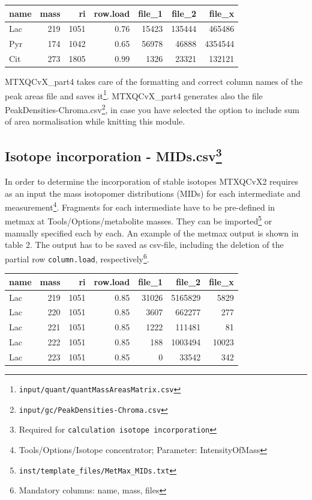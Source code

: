 \documentclass[]{book}
\let\rmarkdownfootnote\footnote%
\def\footnote{\protect\rmarkdownfootnote}
\theoremstyle{definition}
\theoremstyle{definition}
\theoremstyle{definition}
\theoremstyle{remark}
\begin{document}
\begin{tabular}{l|r|r|r|r|r|r}
\hline
name & mass & ri & row.load & file\_1 & file\_2 & file\_x\\
\hline
Lac & 219 & 1051 & 0.76 & 15423 & 135444 & 465486\\
\hline
Pyr & 174 & 1042 & 0.65 & 56978 & 46888 & 4354544\\
\hline
Cit & 273 & 1805 & 0.99 & 1326 & 23321 & 132121\\
\hline
\end{tabular}

MTXQCvX\_part4 takes care of the formatting and correct column names of
the peak areas file and saves it\footnote{\texttt{input/quant/quantMassAreasMatrix.csv}}.
MTXQCvX\_part4 generates also the file
PeakDensities-Chroma.csv\footnote{\texttt{input/gc/PeakDensities-Chroma.csv}},
in case you have selected the option to include sum of area
normalisation while knitting this module.

\subsection[Isotope incorporation - MIDs.csv]{\texorpdfstring{Isotope
incorporation - MIDs.csv\footnote{Required for
  \texttt{calculation\ isotope\ incorporation}}}{Isotope incorporation - MIDs.csv}}\label{isotope-incorporation---mids.csv}

In order to determine the incorporation of stable isotopes MTXQCvX2
requires as an input the mass isotopomer distributions (MIDs) for each
intermediate and measurement\footnote{Tools/Options/Isotope
  concentrator; Parameter: IntensityOfMass}. Fragments for each
intermediate have to be pre-defined in metmax at
Tools/Options/metabolite masses. They can be imported\footnote{\texttt{inst/template\_files/MetMax\_MIDs.txt}}
or manually specified each by each. An example of the metmax output is
shown in table 2. The output has to be saved as csv-file, including the
deletion of the partial row \texttt{column.load}, respectively\footnote{Mandatory
  columns: name, mass, files}.

\begin{tabular}{l|r|r|r|r|r|r}
\hline
name & mass & ri & row.load & file\_1 & file\_2 & file\_x\\
\hline
Lac & 219 & 1051 & 0.85 & 31026 & 5165829 & 5829\\
\hline
Lac & 220 & 1051 & 0.85 & 3607 & 662277 & 277\\
\hline
Lac & 221 & 1051 & 0.85 & 1222 & 111481 & 81\\
\hline
Lac & 222 & 1051 & 0.85 & 188 & 1003494 & 10023\\
\hline
Lac & 223 & 1051 & 0.85 & 0 & 33542 & 342\\
\hline
\end{tabular}
\end{document}
